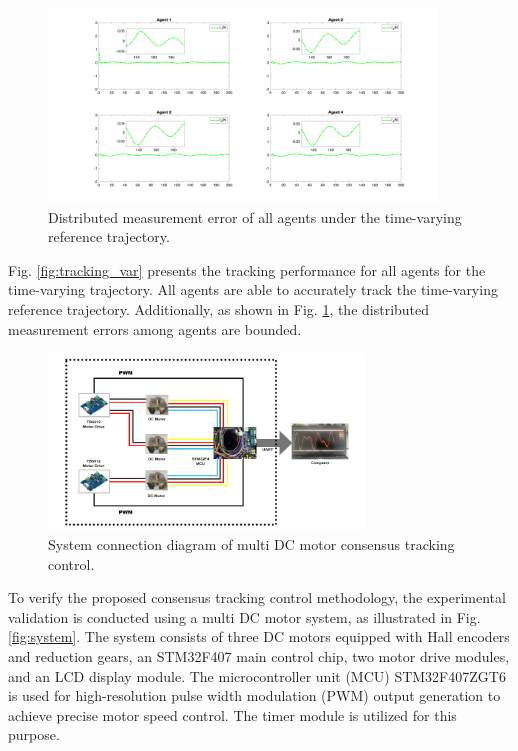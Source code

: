 \documentclass[journal,onecolumn]{IEEEtran}
\begin{document}
\begin{figure}[H]
    \centering
    \includegraphics[width=0.92\textwidth]{var_error.png}
    \caption{Distributed measurement error of all agents under the time-varying reference trajectory.}
    \label{fig:error_var} %
\end{figure}

Fig. \ref{fig:tracking_var} presents the tracking performance for all agents for the time-varying trajectory. All agents are able to accurately track the time-varying reference trajectory. Additionally, as shown in Fig. \ref{fig:error_var}, the distributed measurement errors among agents are bounded.

\begin{figure}[H]
    \centering
    \includegraphics[width=0.75\textwidth]{diagram.jpg}
    \caption{System connection diagram of multi DC motor consensus tracking control.}
    \label{fig:system_diagram} %
\end{figure}

To verify the proposed consensus tracking control methodology, the experimental validation is conducted using a multi DC motor system, as illustrated in Fig. \ref{fig:system}. The system consists of three DC motors equipped with Hall encoders and reduction
gears, an STM32F407 main control chip, two motor drive modules, and an LCD display module. The microcontroller unit (MCU) STM32F407ZGT6 is used for high-resolution pulse width modulation (PWM) output generation to achieve precise motor speed control. The timer module is utilized for this purpose.
\end{document}
